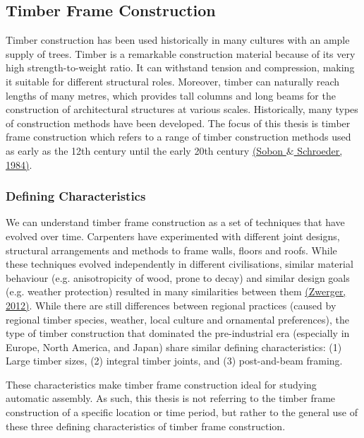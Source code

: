 \documentclass[11pt]{book}
\begin{document}
\subsection{Timber Frame Construction}

Timber construction has been used historically in many cultures with an ample supply of trees. Timber is a remarkable construction material because of its very high strength-to-weight ratio. It can withstand tension and compression, making it suitable for different structural roles. Moreover, timber can naturally reach lengths of many metres, which provides tall columns and long beams for the construction of architectural structures at various scales. Historically, many types of construction methods have been developed. The focus of this thesis is timber frame construction which refers to a range of timber construction methods used as early as the 12th century until the early 20th century \href{https://www.zotero.org/google-docs/?j9TO86}{(Sobon $\&$ Schroeder, 1984)}.

\subsubsection{Defining Characteristics}

We can understand timber frame construction as a set of techniques that have evolved over time. Carpenters have experimented with different joint designs, structural arrangements and methods to frame walls, floors and roofs. While these techniques evolved independently in different civilisations, similar material behaviour (e.g. anisotropicity of wood, prone to decay) and similar design goals (e.g. weather protection) resulted in many similarities between them \href{https://www.zotero.org/google-docs/?RgN7ZN}{(Zwerger, 2012)}. While there are still differences between regional practices (caused by regional timber species, weather, local culture and ornamental preferences), the type of timber construction that dominated the pre-industrial era (especially in Europe, North America, and Japan) share similar defining characteristics: (1) Large timber sizes, (2) integral timber joints, and (3) post-and-beam framing. 

These characteristics make timber frame construction ideal for studying automatic assembly. As such, this thesis is not referring to the timber frame construction of a specific location or time period, but rather to the general use of these three defining characteristics of timber frame construction.
\end{document}
